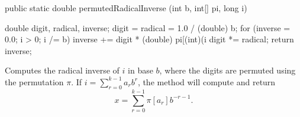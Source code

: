 \begin{code}  

   public static double permutedRadicalInverse (int b, int[] pi, long i)\begin{hide} {
      double digit, radical, inverse;
      digit = radical = 1.0 / (double) b;
      for (inverse = 0.0; i > 0; i /= b) {
         inverse += digit * (double) pi[(int)(i %
         digit *= radical;
      }
      return inverse;
   }
\end{hide}
\end{code}
 \begin{tabb}
   Computes the radical inverse of $i$ in base $b$, where the digits
   are permuted using the permutation $\pi$.
   If $i=\sum_{r=0}^{k-1} a_r b^r$, the method will compute and return
   \[
     x = \sum_{r=0}^{k-1} \pi[a_r] b^{-r-1}.
   \]
 \end{tabb}
\begin{htmlonly}
\end{htmlonly}
\begin{code}\begin{hide}
}\end{hide}\end{code}

